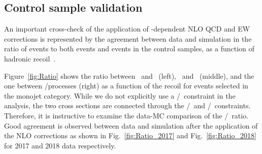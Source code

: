 \newpage

\subsection{Control sample validation}

An important cross-check of the application of \pt-dependent NLO QCD and EW corrections
is represented by the agreement between data and simulation in the ratio of
\Zjets events to both \phojets events
and \Wjets events in the control samples, as a function of hadronic recoil~\pt.

Figure~\ref{fig:Ratio} shows the ratio
between \Zlljets~and \phojets~(left), \Zlljets~and \Wlvjets~(middle),
and the one between \Wlvjets/\phojets processes (right) as a function of the recoil for events selected in the monojet category.
While we do not explicitly use a \Wlvjets/\phojets~constraint in the analysis, the two cross sections
are connected through the \Zjets/\phojets~and \Zjets/\Wjets~constraints. Therefore, it is instructive to examine
the data-MC comparison of the \Wlvjets/\phojets~ratio.
Good agreement is observed between data and simulation after the application of the NLO corrections as shown in Fig.~\ref{fig:Ratio_2017} and 
Fig.~\ref{fig:Ratio_2018} for 2017 and 2018 data respectively.


